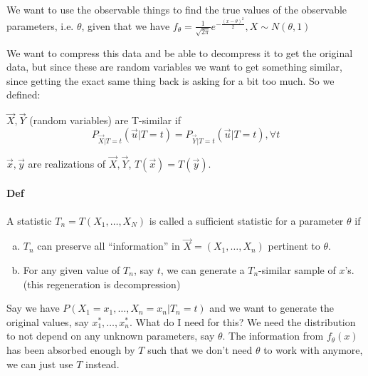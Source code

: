 \documentclass[12 pt]{article}
\begin{document}
    We want to use the observable
    things to find the true values of the observable parameters,
    i.e. $\theta$, given that we have $f_{\theta} =
    \frac{1}{\sqrt{2\pi}}e^{-\frac{(x-\theta)^2}{2}}, X \sim N(\theta,1)$

    We want to compress this data and be able to decompress it to get
    the original data, but since these are random variables we want to
    get something similar, since getting the exact same thing back is
    asking for a bit too much. So we defined:

    $\vec{X}, \vec{Y}$ (random variables) are T-similar if
    $$P_{\vec{X}|T = t}(\vec{u} | T = t) = P_{\vec{Y}|T = t}(\vec{u}|T
    = t), \forall t$$

    $\vec{x}, \vec{y}$ are realizations of $\vec{X}, \vec{Y}$,
    $T(\vec{x}) = T(\vec{y})$.
    \paragraph{Def} A statistic $T_n = T(X_1, \ldots, X_N)$ is called
    a sufficient statistic for a parameter $\theta$ if
    \begin{enumerate}[a)]
    \item $T_n$ can preserve all ``information'' in $\vec{X} = (X_1,
      \ldots, X_n)$ pertinent to $\theta$.
    \item For any given value of $T_n$, say $t$, we can generate a
      $T_n$-similar sample of $x$'s. (this regeneration is decompression)
    \end{enumerate}
    Say we have $P(X_1 = x_1, \ldots, X_n = x_n | T_n = t)$ and we
    want to generate the original values, say $x_1^*, \ldots,
    x_n^*$. What do I need for this? We need the distribution to not
    depend on any unknown parameters, say $\theta$. The information
    from $f_\theta(x)$ has been absorbed enough by $T$ such that we
    don't need $\theta$ to work with anymore, we can just use $T$
    instead.
\end{document}

